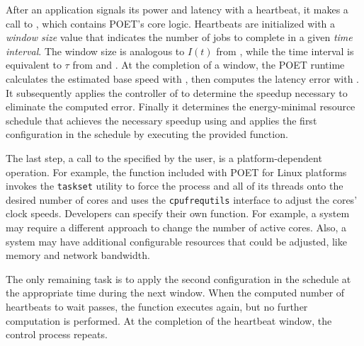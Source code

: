 After an application signals its power and latency with a heartbeat, it makes a call to , which contains POET's core logic.
Heartbeats are initialized with a {\em window size} value that indicates the number of jobs to complete in a given {\em time interval}.
The window size is analogous to $I(t)$ from , while the time interval is equivalent to $\tau$ from  and .
At the completion of a window, the POET runtime calculates the estimated base speed with , then computes the latency error with .
It subsequently applies the controller of  to determine the speedup necessary to eliminate the computed error.
Finally it determines the energy-minimal resource schedule that achieves the necessary speedup using  and applies the first configuration in the schedule by executing the provided  function.

The last step, a call to the  specified by the user, is a platform-dependent operation.
For example, the function included with POET for Linux platforms invokes the \mbox{\texttt{taskset}} utility to force the process and all of its threads onto the desired number of cores and uses the \mbox{\texttt{cpufrequtils}} interface to adjust the cores' clock speeds.
Developers can specify their own function.
For example, a system may require a different approach to change the number of active cores.
Also, a system may have additional configurable resources that could be adjusted, like memory and network bandwidth.

The only remaining task is to apply the second configuration in the schedule at the appropriate time during the next window.
When the computed number of heartbeats to wait passes, the  function executes again, but no further computation is performed.
At the completion of the heartbeat window, the control process repeats.

